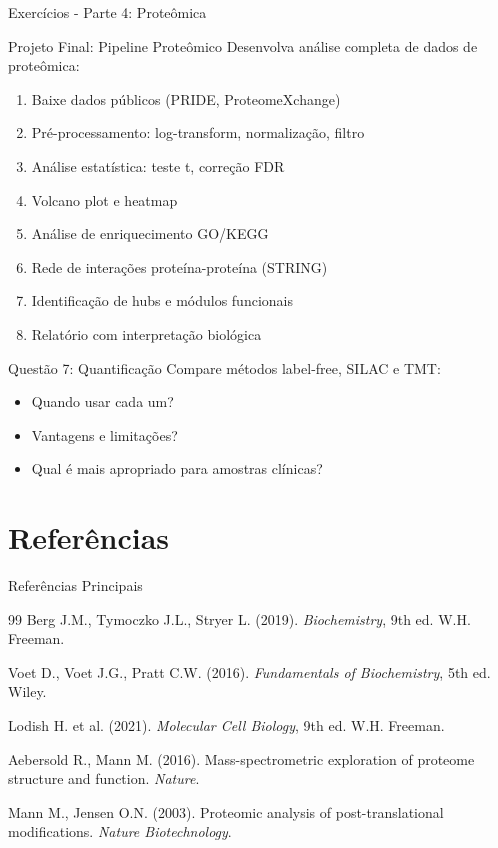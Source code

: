 \begin{frame}[allowframebreaks]{Exercícios - Parte 4: Proteômica}
\begin{alertblock}{Projeto Final: Pipeline Proteômico}
Desenvolva análise completa de dados de proteômica:
\begin{enumerate}
    \item Baixe dados públicos (PRIDE, ProteomeXchange)
    \item Pré-processamento: log-transform, normalização, filtro
    \item Análise estatística: teste t, correção FDR
    \item Volcano plot e heatmap
    \item Análise de enriquecimento GO/KEGG
    \item Rede de interações proteína-proteína (STRING)
    \item Identificação de hubs e módulos funcionais
    \item Relatório com interpretação biológica
\end{enumerate}
\end{alertblock}

\begin{block}{Questão 7: Quantificação}
Compare métodos label-free, SILAC e TMT:
\begin{itemize}
    \item Quando usar cada um?
    \item Vantagens e limitações?
    \item Qual é mais apropriado para amostras clínicas?
\end{itemize}
\end{block}
\end{frame}

\section{Referências}

\begin{frame}[allowframebreaks]{Referências Principais}
\begin{thebibliography}{99}
 Berg J.M., Tymoczko J.L., Stryer L. (2019). \textit{Biochemistry}, 9th ed. W.H. Freeman.

 Voet D., Voet J.G., Pratt C.W. (2016). \textit{Fundamentals of Biochemistry}, 5th ed. Wiley.

 Lodish H. et al. (2021). \textit{Molecular Cell Biology}, 9th ed. W.H. Freeman.

 Aebersold R., Mann M. (2016). Mass-spectrometric exploration of proteome structure and function. \textit{Nature}.

 Mann M., Jensen O.N. (2003). Proteomic analysis of post-translational modifications. \textit{Nature Biotechnology}.
\end{thebibliography}
\end{frame}

